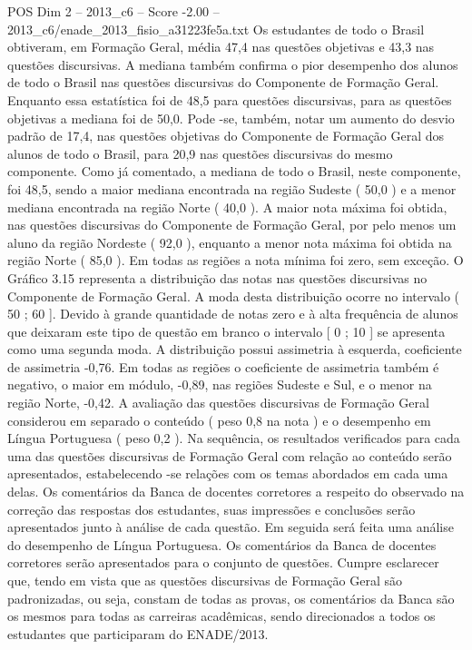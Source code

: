\begin{textsample}{POS Dim 2 – 2013\_c6 – Score -2.00 – 2013\_c6/enade\_2013\_fisio\_a31223fe5a.txt}
Os estudantes de todo o Brasil obtiveram, em Formação Geral, média 47,4 nas questões objetivas e 43,3 nas questões discursivas.
A mediana também confirma o pior desempenho dos alunos de todo o Brasil nas questões discursivas do Componente de Formação Geral.
Enquanto essa estatística foi de 48,5 para questões discursivas, para as questões objetivas a mediana foi de 50,0.
Pode -se, também, notar um aumento do desvio padrão de 17,4, nas questões objetivas do Componente de Formação Geral dos alunos de todo o Brasil, para 20,9 nas questões discursivas do mesmo componente.
Como já comentado, a mediana de todo o Brasil, neste componente, foi 48,5, sendo a maior mediana encontrada na região Sudeste ( 50,0 ) e a menor mediana encontrada na região Norte ( 40,0 ).
A maior nota máxima foi obtida, nas questões discursivas do Componente de Formação Geral, por pelo menos um aluno da região Nordeste ( 92,0 ), enquanto a menor nota máxima foi obtida na região Norte ( 85,0 ).
Em todas as regiões a nota mínima foi zero, sem exceção.
O Gráfico 3.15 representa a distribuição das notas nas questões discursivas no Componente de Formação Geral.
A moda desta distribuição ocorre no intervalo ( 50 ; 60 ].
Devido à grande quantidade de notas zero e à alta frequência de alunos que deixaram este tipo de questão em branco o intervalo [ 0 ; 10 ] se apresenta como uma segunda moda.
A distribuição possui assimetria à esquerda, coeficiente de assimetria -0,76.
Em todas as regiões o coeficiente de assimetria também é negativo, o maior em módulo, -0,89, nas regiões Sudeste e Sul, e o menor na região Norte, -0,42.
A avaliação das questões discursivas de Formação Geral considerou em separado o conteúdo ( peso 0,8 na nota ) e o desempenho em Língua Portuguesa ( peso 0,2 ).
Na sequência, os resultados verificados para cada uma das questões discursivas de Formação Geral com relação ao conteúdo serão apresentados, estabelecendo -se relações com os temas abordados em cada uma delas.
Os comentários da Banca de docentes corretores a respeito do observado na correção das respostas dos estudantes, suas impressões e conclusões serão apresentados junto à análise de cada questão.
Em seguida será feita uma análise do desempenho de Língua Portuguesa.
Os comentários da Banca de docentes corretores serão apresentados para o conjunto de questões.
Cumpre esclarecer que, tendo em vista que as questões discursivas de Formação Geral são padronizadas, ou seja, constam de todas as provas, os comentários da Banca são os mesmos para todas as carreiras acadêmicas, sendo direcionados a todos os estudantes que participaram do ENADE/2013.

\end{textsample}
